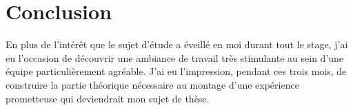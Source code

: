 \documentclass[a4paper,10pt]{article}
\begin{document}
\section{Conclusion}
En plus de l'int\'{e}r\^{e}t que le sujet d'\'{e}tude a \'{e}veill\'{e} en moi durant tout le
stage, j'ai eu l'occasion de d\'{e}couvrir une ambiance de travail tr\`{e}s stimulante
au sein d'une \'{e}quipe particuli\`{e}rement agr\'{e}able. J'ai eu l'impression, pendant
ces trois mois, de construire la partie th\'{e}orique n\'{e}cessaire au montage d'une
exp\'{e}rience prometteuse qui deviendrait mon sujet de th\`{e}se.
\end{document}

